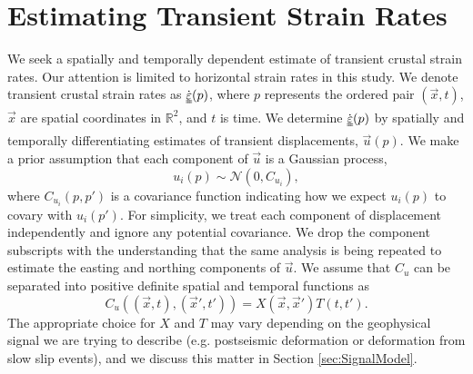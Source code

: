 \documentclass[10pt,letter]{article}
\newcommand*{\du}[1]{\uuline{#1}}
\begin{document}
\section{Estimating Transient Strain Rates}\label{sec:Method}
We seek a spatially and temporally dependent estimate of transient crustal strain rates. Our attention is limited to horizontal strain rates in this study. We denote transient crustal strain rates as $\dot{\du{\varepsilon}}(p)$, where $p$ represents the ordered pair $(\vec{x},t)$, $\vec{x}$ are spatial coordinates in $\mathbb{R}^2$, and $t$ is time. We determine $\dot{\du{\varepsilon}}(p)$ by spatially and temporally differentiating estimates of transient displacements, $\vec{u}(p)$. We make a prior assumption that each component of $\vec{u}$ is a Gaussian process,
\begin{equation}\label{eq:TransientDeformation}
u_i(p) \sim \mathcal{N}\left(0,C_{u_i}\right),
\end{equation}
where $C_{u_i}(p,p')$ is a covariance function indicating how we expect $u_i(p)$ to covary with $u_i(p')$. For simplicity, we treat each component of displacement independently and ignore any potential covariance. We drop the component subscripts with the understanding that the same analysis is being repeated to estimate the easting and northing components of $\vec{u}$. We assume that $C_u$ can be separated into positive definite spatial and temporal functions as 
\begin{equation}\label{eq:TransientCovariance}
C_{u}\left((\vec{x},t),(\vec{x}',t')\right) = X(\vec{x},\vec{x}')T(t,t').
\end{equation}  
The appropriate choice for $X$ and $T$ may vary depending on the geophysical signal we are trying to describe (e.g. postseismic deformation or deformation from slow slip events), and we discuss this matter in Section \ref{sec:SignalModel}.  
\end{document}
